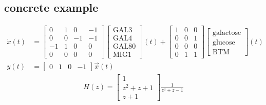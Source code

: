 \documentclass[11 pt]{article}
\begin{document}
    \subsection{concrete example}
    \begin{align*}
      \dot{x}(t) &= \begin{bmatrix} 0 & 1 & 0 & -1 \\ 0 & 0 & -1 & -1 \\ -1 & 1 & 0 & 0 \\ 0 & 0 & 0 & 0 \end{bmatrix} \begin{bmatrix} \text{GAL3} \\ \text{GAL4} \\ \text{GAL80} \\ \text{MIG1} \end{bmatrix}(t) + \begin{bmatrix} 1 & 0 & 0 \\ 0 & 0 & 1 \\ 0 & 0 & 0 \\ 0 & 1 & 1 \end{bmatrix} \begin{bmatrix} \text{galactose} \\ \text{glucose} \\ \text{BTM} \end{bmatrix}(t) \\
        y(t) &= \begin{bmatrix} 0 & 1 & 0 & -1 \end{bmatrix} \vec{x}(t)
    \end{align*}
    \begin{align*}
      H(z) = \begin{bmatrix} 1 \\ z^{2} + z + 1 \\ z + 1 \end{bmatrix} \frac{1}{z^{3} + z -1}
    \end{align*}
\end{document}
